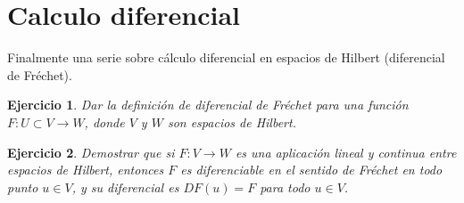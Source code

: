\documentclass[11pt]{report}
\newtheorem{ex}{Ejercicio}
\newenvironment{solution}{\begin{proof}[Solución]}{\end{proof}}
\newcommand{\norma}[1]{\Vert #1 \Vert_V}
\newcommand{\Huno}{H^1}
\begin{document}

\section{Calculo diferencial}


\noindent
Finalmente una serie sobre cálculo diferencial en espacios de Hilbert (diferencial de Fréchet).

\begin{ex}
Dar la definición de diferencial de Fréchet para una función $F: U \subset V \to W$, donde $V$ y $W$ son espacios de Hilbert.
\end{ex}


\begin{ex}
Demostrar que si $F: V \to W$ es una aplicación lineal y continua entre espacios de Hilbert, entonces $F$ es diferenciable en el sentido de Fréchet en todo punto $u \in V$, y su diferencial es $DF(u) = F$ para todo $u \in V$.
\end{ex}

\end{document}
